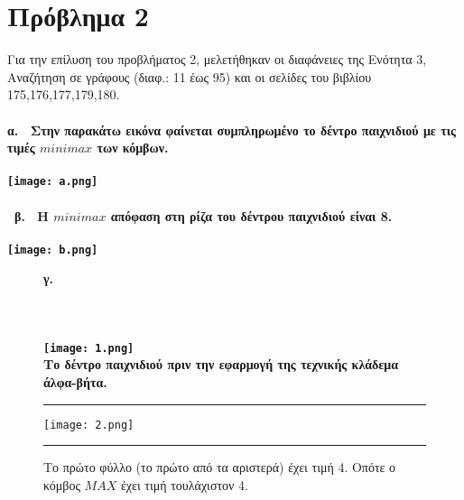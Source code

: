 \documentclass[10pt]{article}
\begin{document}
\section*{Πρόβλημα 2}
\vspace{1em}
Για την επίλυση του προβλήματος 2, μελετήθηκαν οι διαφάνειες της Ενότητα 3, Αναζήτηση σε γράφους (διαφ.: 11 έως 95) και οι σελίδες του βιβλίου 175,176,177,179,180. \\ \\  
\bf α. \ \normalfont Στην παρακάτω εικόνα φαίνεται συμπληρωμένο το δέντρο παιχνιδιού με τις τιμές $minimax$ των κόμβων.  \\ \\
\texttt{[image: a.png]}\\\\\
\bf β. \ \normalfont H $minimax$ απόφαση στη ρίζα του δέντρου παιχνιδιού είναι \bf 8. 
  \\ \\
\texttt{[image: b.png]} 
\begin{figure}[H]
\bf γ. \ \normalfont \\ \\ \\ \\ 
    \texttt{[image: 1.png]}\\ 
    \caption{ Το δέντρο παιχνιδιού πριν την εφαρμογή της τεχνικής κλάδεμα άλφα-βήτα.}
    
    \begin{center}
        \rule{120mm}{0.2mm}
    \end{center}
 
    \vspace{20mm}

    \texttt{[image: 2.png]}\\ 
    \caption{Το πρώτο φύλλο (το πρώτο από τα αριστερά) έχει τιμή 4. Οπότε ο κόμβος $MAX$ έχει τιμή τουλάχιστον 4.  }
    
    \begin{center}
        \rule{120mm}{0.2mm}
    \end{center}
    
\end{figure}
\end{document}
